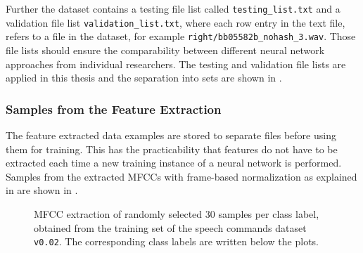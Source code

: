 Further the dataset contains a testing file list called \texttt{testing\_list.txt} and a validation file list \texttt{validation\_list.txt}, where each row entry in the text file, refers to a file in the dataset, for example \texttt{right/bb05582b\_nohash\_3.wav}.
Those file lists should ensure the comparability between different neural network approaches from individual researchers.
The testing and validation file lists are applied in this thesis and the separation into sets are shown in .



\subsubsection{Samples from the Feature Extraction}
The feature extracted data examples are stored to separate files before using them for training.
This has the practicability that features do not have to be extracted each time a new training instance of a neural network is performed.
Samples from the extracted MFCCs with frame-based normalization as explained in  are shown in .
\begin{figure}[!ht]
  \centering
  \caption{MFCC extraction of randomly selected 30 samples per class label, obtained from the training set of the speech commands dataset \texttt{v0.02}. The corresponding class labels are written below the plots.}
  \label{fig:exp_dataset_speech_cmd_mfcc}
\end{figure}
